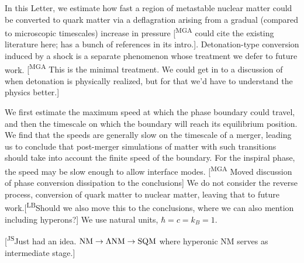 \documentclass[10pt,superscriptaddress,
amsmath,aps,prl,twocolumn,nofootinbib]{revtex4-1}
\newcommand{\mga}[1]{{\color[rgb]{0.8,0,0}#1}}
\newcommand{\mgacom}[1]{\textsf{\color[rgb]{0.6,0,0}[\textsuperscript{MGA} #1]}}
\newcommand{\AH}[1]{{\color{cyan}#1}}
\newcommand{\LBcom}[1]{\textsf{\color{brown}[\textsuperscript{LB}#1]}}
\newcommand{\JS}[1]{{\color{violet}#1}}
\newcommand{\JScom}[1]{\textsf{\color{violet} [\textsuperscript{JS}#1]}}
\begin{document}

In this Letter, we estimate how fast a region of metastable nuclear matter could be converted to quark matter \mga{via a deflagration arising from a gradual (compared to microscopic timescales) increase in pressure \mgacom{could cite the existing literature here; \cite{Furusawa:2015gjj} has a bunch of references in its intro.}. Detonation-type conversion induced by a shock is a separate phenomenon \cite{Furusawa:2015gjj} whose treatment we defer to future work.}
\mgacom{This is the minimal treatment. We could get in to a discussion of when detonation is physically realized, but for that we'd have to understand the physics better.}%

We first estimate the maximum speed at which the phase boundary could travel, and then the timescale on which the boundary will reach its equilibrium position. We find that the speeds are generally slow on the timescale of a merger, leading us to conclude that \mga{post-merger} simulations of matter with such transitions should take into account the finite speed of the boundary. 
\mga{For the inspiral phase, the speed may be slow enough to allow} interface modes. \mgacom{Moved discussion of phase conversion dissipation to the conclusions}
We do not consider the reverse process, conversion of quark matter to nuclear matter, %
leaving that to future work.\LBcom{Should we also move this to the conclusions, where we can also mention including hyperons?}
We use natural units, $\hbar=c=k_B=1$.

\JScom{Just had an idea. $\rm NM\to \Lambda NM \to SQM$ where hyperonic NM serves as intermediate stage.}

\end{document}
